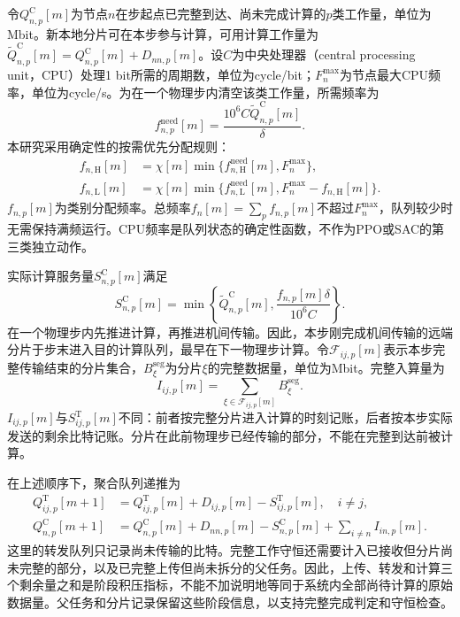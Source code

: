 令$Q_{n,p}^{\mathrm C}[m]$为节点$n$在步起点已完整到达、尚未完成计算的$p$类工作量，单位为Mbit。新本地分片可在本步参与计算，可用计算工作量为$\widetilde Q_{n,p}^{\mathrm C}[m]=Q_{n,p}^{\mathrm C}[m]+D_{nn,p}[m]$。设$C$为中央处理器（central processing unit，CPU）处理1 bit所需的周期数，单位为cycle/bit；$F_n^{\max}$为节点最大CPU频率，单位为cycle/s。为在一个物理步内清空该类工作量，所需频率为
\begin{equation}
 f_{n,p}^{\mathrm{need}}[m]=
 \frac{10^6 C\widetilde Q_{n,p}^{\mathrm C}[m]}{\delta}.
 \label{eq:cpuneed}
\end{equation}
本研究采用确定性的按需优先分配规则：
\begin{equation}
 \begin{aligned}
 f_{n,\mathrm H}[m]&=\chi[m]\min\{f_{n,\mathrm H}^{\mathrm{need}}[m],F_n^{\max}\},\\
 f_{n,\mathrm L}[m]&=\chi[m]\min\{f_{n,\mathrm L}^{\mathrm{need}}[m],
 F_n^{\max}-f_{n,\mathrm H}[m]\}.
 \end{aligned}
 \label{eq:cpuallocation}
\end{equation}
$f_{n,p}[m]$为类别分配频率。总频率$f_n[m]=\sum_p f_{n,p}[m]$不超过$F_n^{\max}$，队列较少时无需保持满频运行。CPU频率是队列状态的确定性函数，不作为PPO或SAC的第三类独立动作。

实际计算服务量$S^{\mathrm C}_{n,p}[m]$满足
\begin{equation}
 S^{\mathrm C}_{n,p}[m]=
 \min\left\{\widetilde Q_{n,p}^{\mathrm C}[m],
 \frac{f_{n,p}[m]\delta}{10^6C}\right\}.
 \label{eq:cpuservice}
\end{equation}
在一个物理步内先推进计算，再推进机间传输。因此，本步刚完成机间传输的远端分片于步末进入目的计算队列，最早在下一物理步计算。令$\mathcal F_{ij,p}[m]$表示本步完整传输结束的分片集合，$B_\xi^{\mathrm{seg}}$为分片$\xi$的完整数据量，单位为Mbit。完整入算量为
\begin{equation}
 I_{ij,p}[m]=\sum_{\xi\in\mathcal F_{ij,p}[m]}B_\xi^{\mathrm{seg}}.
 \label{eq:admittedwork}
\end{equation}
$I_{ij,p}[m]$与$S^{\mathrm T}_{ij,p}[m]$不同：前者按完整分片进入计算的时刻记账，后者按本步实际发送的剩余比特记账。分片在此前物理步已经传输的部分，不能在完整到达前被计算。

在上述顺序下，聚合队列递推为
\begin{equation}
 \begin{aligned}
 Q_{ij,p}^{\mathrm T}[m+1]
 &=Q_{ij,p}^{\mathrm T}[m]+D_{ij,p}[m]
 -S_{ij,p}^{\mathrm T}[m],\quad i\ne j,\\
 Q_{n,p}^{\mathrm C}[m+1]
 &=Q_{n,p}^{\mathrm C}[m]+D_{nn,p}[m]
 -S_{n,p}^{\mathrm C}[m]+\sum_{i\ne n}I_{in,p}[m].
 \end{aligned}
 \label{eq:queueupdate}
\end{equation}
这里的转发队列只记录尚未传输的比特。完整工作守恒还需要计入已接收但分片尚未完整的部分，以及已完整上传但尚未拆分的父任务。因此，上传、转发和计算三个剩余量之和是阶段积压指标，不能不加说明地等同于系统内全部尚待计算的原始数据量。父任务和分片记录保留这些阶段信息，以支持完整完成判定和守恒检查。

